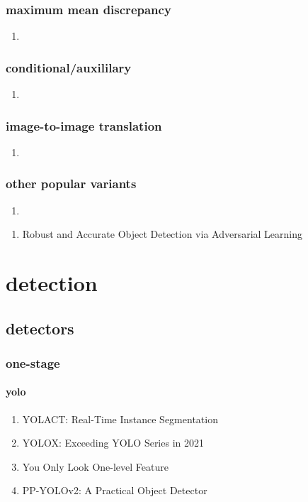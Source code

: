 \documentclass[acmlarge]{acmart}
\begin{document}
		\subsubsection{maximum mean discrepancy}
		\begin{enumerate}
			\item
		\end{enumerate}
		\subsubsection{conditional/auxililary}
		\begin{enumerate}
			\item
		\end{enumerate}
		\subsubsection{image-to-image translation}
		\begin{enumerate}
			\item
		\end{enumerate}
		\subsubsection{other popular variants}
		\begin{enumerate}
			\item
		\end{enumerate}
	\begin{enumerate}
	\end{enumerate}
\begin{enumerate}
	\item Robust and Accurate Object Detection via Adversarial Learning \cite{Chen2021RobustAA} 

\end{enumerate}
\section{detection}
	\subsection{detectors}
		\subsubsection{one-stage}
			\paragraph{yolo}
			\begin{enumerate}
				\item YOLACT: Real-Time Instance Segmentation \cite{Bolya2019YOLACTRI} 

				\item YOLOX: Exceeding YOLO Series in 2021 \cite{Ge2021YOLOXEY} 

				\item You Only Look One-level Feature \cite{Chen2021YouOL} 

				\item PP-YOLOv2: A Practical Object Detector \cite{Huang2021PPYOLOv2AP} 

			\end{enumerate}
\end{document}
